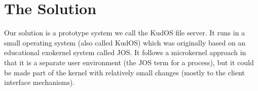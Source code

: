 \section{The Solution}
\label{sec:solution}

Our solution is a prototype system we call the KudOS file server. It runs in a
small operating system (also called KudOS) which was originally based on an
educational exokernel system called JOS. It follows a microkernel approach in
that it is a separate user environment (the JOS term for a process), but it
could be made part of the kernel with relatively small changes (mostly to the
client interface mechanisms).



